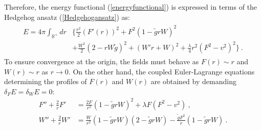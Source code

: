 \documentclass[a4paper,11pt]{article}
\begin{document}
Therefore, the energy functional (\ref{energyfunctional}) is expressed in terms of the Hedgehog ansatz (\ref{Hedgehogansatz}) as:
\begin{align}\label{energyfunctional2}
    \begin{split}
        E = 4\pi \int_{\mathbb{R}^+} dr& \Big\{ \frac{r^2}{2} (F'(r))^2 + F^2 (1 - \tilde{g} r W)^2  \\
    &  + \frac{W^2}{2} (2 - r W \tilde{g})^2 + (W' r + W)^2 + \frac{\lambda}{4} r^2 (F^2 - v^2)^2 \Big\}\ .
    \end{split}
\end{align}
To ensure convergence at the origin, the fields must behave as $F(r) \sim r$ and $W(r) \sim r$ as $r \to 0$. On the other hand, the coupled Euler-Lagrange equations determining the profiles of $F(r)$ and $W(r)$ are obtained by demanding $\delta_{F}E=\delta_{W}E=0$:
\begin{align}
     F'' + \frac{2}{r} F' &= \frac{2F}{r^2} (1 - \tilde{g} r W)^2 + \lambda F (F^2 - v^2)\ ,\\
 W'' + \frac{2}{r} W' &= \frac{W}{r^2} (1 - \tilde{g} r W)(2 - \tilde{g} r W) - \frac{\tilde{g} F^2}{r} (1 - \tilde{g} r W)\ .
\end{align}
\end{document}
